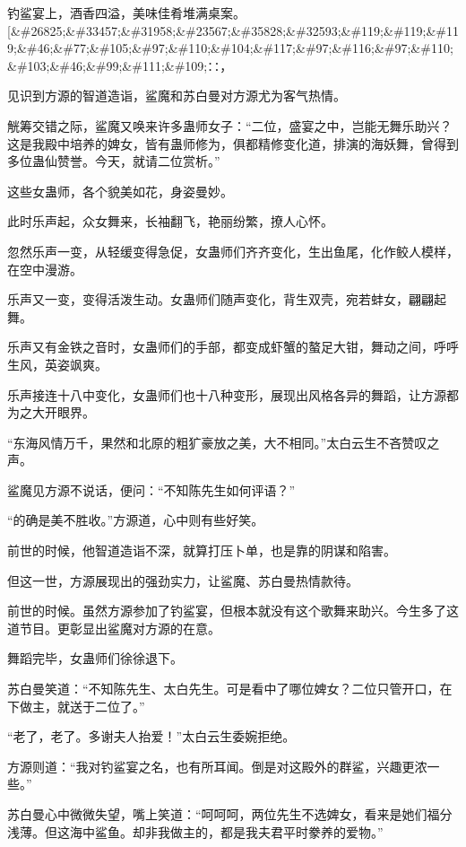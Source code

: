 
\begin{this_body}

钓鲨宴上，酒香四溢，美味佳肴堆满桌案。[\&\#26825;\&\#33457;\&\#31958;\&\#23567;\&\#35828;\&\#32593;\&\#119;\&\#119;\&\#119;\&\#46;\&\#77;\&\#105;\&\#97;\&\#110;\&\#104;\&\#117;\&\#97;\&\#116;\&\#97;\&\#110;\&\#103;\&\#46;\&\#99;\&\#111;\&\#109;∷，

见识到方源的智道造诣，鲨魔和苏白曼对方源尤为客气热情。

觥筹交错之际，鲨魔又唤来许多蛊师女子：“二位，盛宴之中，岂能无舞乐助兴？这是我殿中培养的婢女，皆有蛊师修为，俱都精修变化道，排演的海妖舞，曾得到多位蛊仙赞誉。今天，就请二位赏析。”

这些女蛊师，各个貌美如花，身姿曼妙。

此时乐声起，众女舞来，长袖翻飞，艳丽纷繁，撩人心怀。

忽然乐声一变，从轻缓变得急促，女蛊师们齐齐变化，生出鱼尾，化作鲛人模样，在空中漫游。

乐声又一变，变得活泼生动。女蛊师们随声变化，背生双壳，宛若蚌女，翩翩起舞。

乐声又有金铁之音时，女蛊师们的手部，都变成虾蟹的螯足大钳，舞动之间，呼呼生风，英姿飒爽。

乐声接连十八中变化，女蛊师们也十八种变形，展现出风格各异的舞蹈，让方源都为之大开眼界。

“东海风情万千，果然和北原的粗犷豪放之美，大不相同。”太白云生不吝赞叹之声。

鲨魔见方源不说话，便问：“不知陈先生如何评语？”

“的确是美不胜收。”方源道，心中则有些好笑。

前世的时候，他智道造诣不深，就算打压卜单，也是靠的阴谋和陷害。

但这一世，方源展现出的强劲实力，让鲨魔、苏白曼热情款待。

前世的时候。虽然方源参加了钓鲨宴，但根本就没有这个歌舞来助兴。今生多了这道节目。更彰显出鲨魔对方源的在意。

舞蹈完毕，女蛊师们徐徐退下。

苏白曼笑道：“不知陈先生、太白先生。可是看中了哪位婢女？二位只管开口，在下做主，就送于二位了。”

“老了，老了。多谢夫人抬爱！”太白云生委婉拒绝。

方源则道：“我对钓鲨宴之名，也有所耳闻。倒是对这殿外的群鲨，兴趣更浓一些。”

苏白曼心中微微失望，嘴上笑道：“呵呵呵，两位先生不选婢女，看来是她们福分浅薄。但这海中鲨鱼。却非我做主的，都是我夫君平时豢养的爱物。”


\end{this_body}
